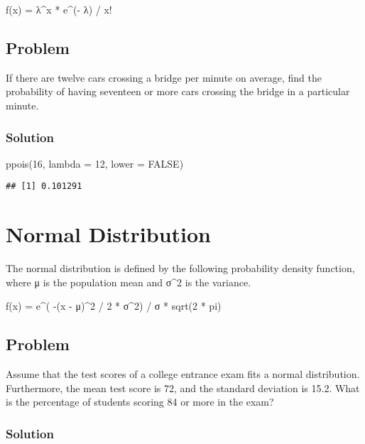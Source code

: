 \documentclass[
]{article}
\newenvironment{Shaded}{\begin{snugshade}}{\end{snugshade}}
\newcommand{\AttributeTok}[1]{\textcolor[rgb]{0.77,0.63,0.00}{#1}}
\newcommand{\ConstantTok}[1]{\textcolor[rgb]{0.00,0.00,0.00}{#1}}
\newcommand{\DecValTok}[1]{\textcolor[rgb]{0.00,0.00,0.81}{#1}}
\newcommand{\FunctionTok}[1]{\textcolor[rgb]{0.00,0.00,0.00}{#1}}
\newcommand{\NormalTok}[1]{#1}
\begin{document}
f(x) = λ\^{}x * e\^{}(- λ) / x!

\hypertarget{problem-3}{%
\subsection{Problem}\label{problem-3}}

If there are twelve cars crossing a bridge per minute on average, find
the probability of having seventeen or more cars crossing the bridge in
a particular minute.

\hypertarget{solution-3}{%
\subsubsection{Solution}\label{solution-3}}

\begin{Shaded}
\begin{Highlighting}[]
\FunctionTok{ppois}\NormalTok{(}\DecValTok{16}\NormalTok{, }\AttributeTok{lambda =} \DecValTok{12}\NormalTok{, }\AttributeTok{lower =} \ConstantTok{FALSE}\NormalTok{)}
\end{Highlighting}
\end{Shaded}

\begin{verbatim}
## [1] 0.101291
\end{verbatim}

\hypertarget{normal-distribution}{%
\section{Normal Distribution}\label{normal-distribution}}

The normal distribution is defined by the following probability density
function, where μ is the population mean and σ\^{}2 is the variance.

f(x) = e\^{}( -(x - μ)\^{}2 / 2 * σ\^{}2) / σ * sqrt(2 * pi)

\hypertarget{problem-4}{%
\subsection{Problem}\label{problem-4}}

Assume that the test scores of a college entrance exam fits a normal
distribution. Furthermore, the mean test score is 72, and the standard
deviation is 15.2. What is the percentage of students scoring 84 or more
in the exam?

\hypertarget{solution-4}{%
\subsubsection{Solution}\label{solution-4}}
\end{document}
